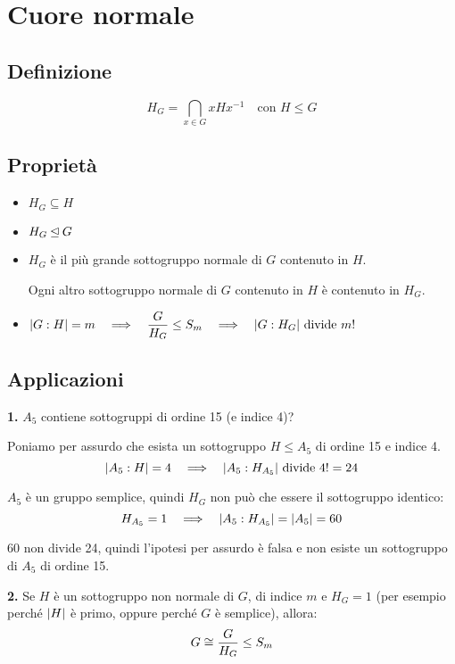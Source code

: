 \chapter{Cuore normale}
\label{ch:cuore_normale}

\section{Definizione}
\label{sec:cuore_normale_definizione}

\begin{equation*}
    H_G = \bigcap_{x \in G} xHx^{-1} \quad \text{con } H \le G
\end{equation*}

\section{Proprietà}
\label{sec:cuore_normale_proprieta}

\begin{itemize}
    \item $H_G \subseteq H$
    \item $H_G \unlhd G$
    \item $H_G$ è il più grande sottogruppo normale di $G$ contenuto in $H$.

        Ogni altro sottogruppo normale di $G$ contenuto in $H$ è contenuto in $H_G$.
    \item $\lvert G:H \rvert = m \quad\Longrightarrow\quad \dfrac{G}{H_G} \le S_m \quad\Longrightarrow\quad \lvert G:H_G \rvert \text{ divide } m!$
\end{itemize}

\section{Applicazioni}
\label{sec:cuore_normale_applicazioni}

\textbf{1.}
$A_5$ contiene sottogruppi di ordine 15 (e indice 4)?

Poniamo per assurdo che esista un sottogruppo $H \le A_5$ di ordine 15 e indice 4.
\begin{equation*}
    \lvert A_5:H \rvert = 4 \quad\Longrightarrow\quad \lvert A_5:H_{A_5} \rvert \text{ divide } 4! = 24
\end{equation*}

$A_5$ è un gruppo semplice, quindi $H_G$ non può che essere il sottogruppo identico:
\begin{equation*}
    H_{A_5} = 1 \quad\Longrightarrow\quad \lvert A_5:H_{A_5} \rvert = \lvert A_5 \rvert = 60
\end{equation*}

60 non divide 24, quindi l'ipotesi per assurdo è falsa e non esiste un sottogruppo di $A_5$ di ordine 15.

\bigskip
\noindent\textbf{2.}
Se $H$ è un sottogruppo non normale di $G$, di indice $m$ e $H_G=1$ (per esempio perché $\lvert H \rvert$ è primo,
oppure perché $G$ è semplice), allora:
\begin{equation*}
    G \cong \dfrac{G}{H_G} \le S_m
\end{equation*}

